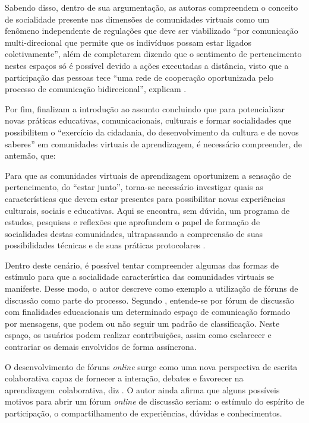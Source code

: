 Sabendo disso, dentro de sua argumentação, as autoras compreendem o conceito de socialidade presente nas dimensões de comunidades virtuais como um fenômeno independente de regulações que deve ser viabilizado ``por comunicação multi-direcional que permite que os indivíduos possam estar ligados coletivamente'', além de completarem dizendo que o sentimento de pertencimento nestes espaços só é possível devido a ações executadas a distância, visto que a participação das pessoas tece “uma rede de cooperação oportunizada pelo processo de comunicação bidirecional'', explicam .

Por fim,  finalizam a introdução ao assunto concluindo que para potencializar novas práticas educativas, comunicacionais, culturais e formar socialidades que possibilitem o ``exercício da cidadania, do desenvolvimento da cultura e de novos saberes'' em comunidades virtuais de aprendizagem, é necessário compreender, de antemão, que:

\begin{citacao}
Para que as comunidades virtuais de aprendizagem oportunizem a sensação de pertencimento, do “estar junto”, torna-se necessário investigar quais as características que devem estar presentes para possibilitar novas experiências culturais, sociais e educativas. Aqui se encontra, sem dúvida, um programa de estudos, pesquisas e reflexões que aprofundem o papel de formação de socialidades destas comunidades, ultrapassando a compreensão de suas possibilidades técnicas e de suas práticas protocolares \cite{sartori2004comunidades}.

\end{citacao}

Dentro deste cenário, é possível tentar compreender algumas das formas de estímulo para que a socialidade característica das comunidades virtuais se manifeste. Desse modo, o autor  descreve como exemplo a utilização de fóruns de discussão como parte do processo.
Segundo , entende-se por fórum de discussão com finalidades educacionais um determinado espaço de comunicação formado por mensagens, que podem ou não seguir um padrão de classificação. Neste espaço, os usuários podem realizar contribuições, assim como esclarecer e contrariar os demais envolvidos de forma assíncrona.

O desenvolvimento de fóruns \textit{online} surge como uma nova perspectiva de escrita colaborativa capaz de fornecer a interação, debates e favorecer na aprendizagem colaborativa, diz . O autor ainda afirma que alguns possíveis motivos para abrir um fórum \textit{online} de discussão seriam: o estímulo do espírito de participação, o compartilhamento de experiências, dúvidas e conhecimentos.


